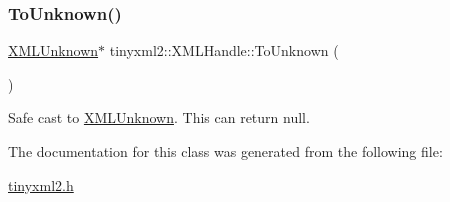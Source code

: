 \subsubsection{\texorpdfstring{To\+Unknown()}{ToUnknown()}}
{\footnotesize\ttfamily \hyperlink{classtinyxml2_1_1_x_m_l_unknown}{X\+M\+L\+Unknown}$\ast$ tinyxml2\+::\+X\+M\+L\+Handle\+::\+To\+Unknown (\begin{DoxyParamCaption}{ }\end{DoxyParamCaption})\hspace{0.3cm}{\ttfamily [inline]}}



Safe cast to \hyperlink{classtinyxml2_1_1_x_m_l_unknown}{X\+M\+L\+Unknown}. This can return null. 



The documentation for this class was generated from the following file\+:\begin{DoxyCompactItemize}
\item 
\hyperlink{tinyxml2_8h}{tinyxml2.\+h}\end{DoxyCompactItemize}
